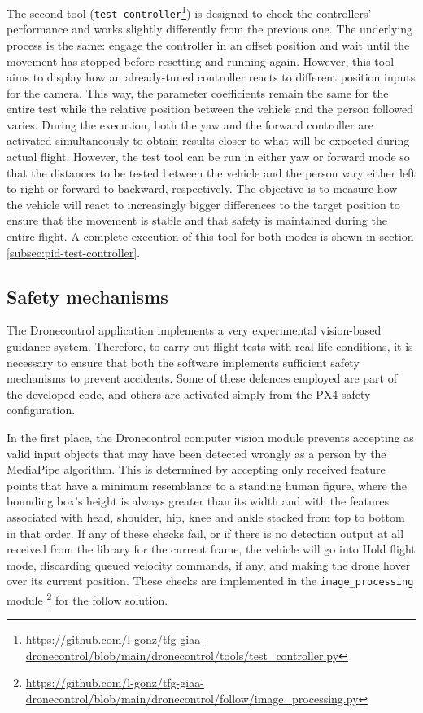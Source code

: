 The second tool (\texttt{test\_controller}\footnote{\url{https://github.com/l-gonz/tfg-giaa-dronecontrol/blob/main/dronecontrol/tools/test_controller.py}}) is designed to check the controllers' performance and works slightly differently from the previous one.
The underlying process is the same: engage the controller in an offset position and wait until the movement has stopped before resetting and running again.
However, this tool aims to display how an already-tuned controller reacts to different position inputs for the camera.
This way, the parameter coefficients remain the same for the entire test while the relative position between the vehicle and the person followed varies.
During the execution, both the yaw and the forward controller are activated simultaneously to obtain results closer to what will be expected during actual flight.
However, the test tool can be run in either yaw or forward mode so that the distances to be tested between the vehicle and the person vary either left to right or forward to backward, respectively.
The objective is to measure how the vehicle will react to increasingly bigger differences to the target position to ensure that the movement is stable and that safety is maintained during the entire flight.
A complete execution of this tool for both modes is shown in section \ref{subsec:pid-test-controller}.


\subsection{Safety mechanisms}
\label{subsec:safety}

The Dronecontrol application implements a very experimental vision-based guidance system.
Therefore, to carry out flight tests with real-life conditions, it is necessary to ensure that both the software implements sufficient safety mechanisms to prevent accidents.
Some of these defences employed are part of the developed code, and others are activated simply from the PX4 safety configuration.

In the first place, the Dronecontrol computer vision module prevents accepting as valid input objects that may have been detected wrongly as a person by the MediaPipe algorithm.
This is determined by accepting only received feature points that have a minimum resemblance to a standing human figure, where the bounding box's height is always greater than its width and with the features associated with head, shoulder, hip, knee and ankle stacked from top to bottom in that order.
If any of these checks fail, or if there is no detection output at all received from the library for the current frame, the vehicle will go into Hold flight mode, discarding queued velocity commands, if any, and making the drone hover over its current position.
These checks are implemented in the \texttt{image\_processing} module \footnote{\url{https://github.com/l-gonz/tfg-giaa-dronecontrol/blob/main/dronecontrol/follow/image_processing.py}} for the follow solution.

